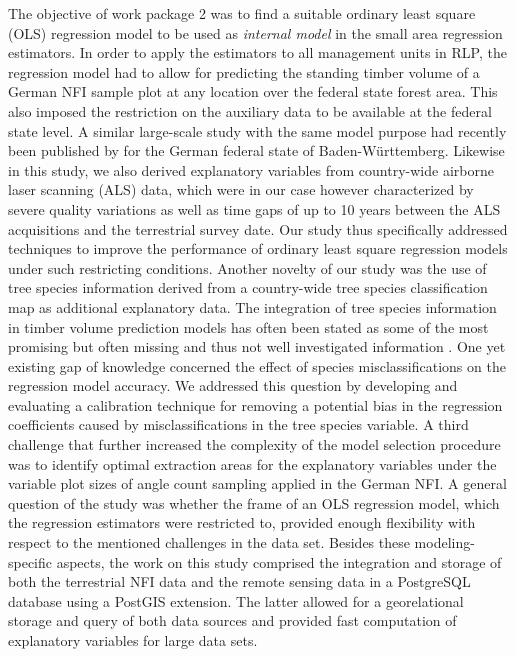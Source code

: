 The objective of work package 2 was to find a suitable ordinary least square (OLS) regression model to be used as \textit{internal model} in the small area regression estimators. In order to apply the estimators to all management units in RLP, the regression model had to allow for predicting the standing timber volume of a German NFI sample plot at any location over the federal state forest area. This also imposed the restriction on the auxiliary data to be available at the federal state level. A similar large-scale study with the same model purpose had recently been published by \citet{maack2016} for the German federal state of Baden-W{\"u}rttemberg. Likewise in this study, we also derived explanatory variables from country-wide airborne laser scanning (ALS) data, which were in our case however characterized by severe quality variations as well as time gaps of up to 10 years between the ALS acquisitions and the terrestrial survey date. Our study thus specifically addressed techniques to improve the performance of ordinary least square regression models under such restricting conditions. Another novelty of our study was the use of tree species information derived from a country-wide tree species classification map as additional explanatory data. The integration of tree species information in timber volume prediction models has often been stated as some of the most promising but often missing and thus not well investigated information \citep{koch2010, white2016}. One yet existing gap of knowledge concerned the effect of species misclassifications on the regression model accuracy. We addressed this question by developing and evaluating a calibration technique for removing a potential bias in the regression coefficients caused by misclassifications in the tree species variable. A third challenge that further increased the complexity of the model selection procedure was to identify optimal extraction areas for the explanatory variables under the variable plot sizes of angle count sampling applied in the German NFI. A general question of the study was whether the frame of an OLS regression model, which the regression estimators were restricted to, provided enough flexibility with respect to the mentioned challenges in the data set. Besides these modeling-specific aspects, the work on this study comprised the integration and storage of both the terrestrial NFI data and the remote sensing data in a PostgreSQL database using a PostGIS extension. The latter allowed for a georelational storage and query of both data sources and provided fast computation of explanatory variables for large data sets.

